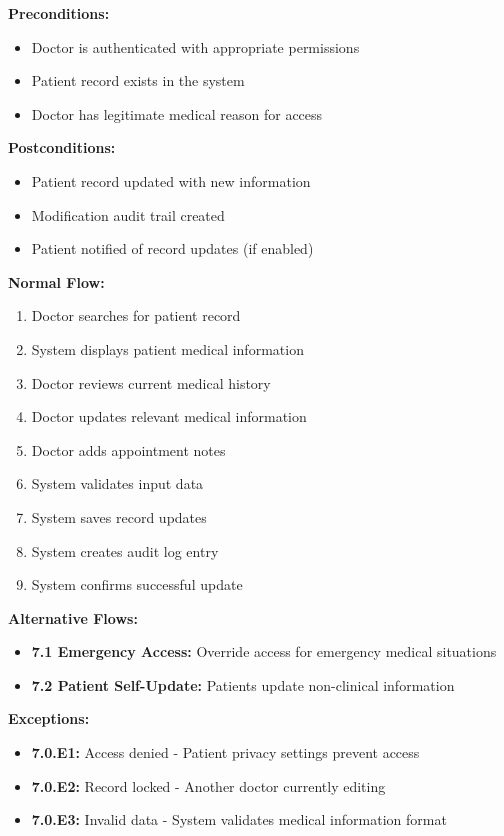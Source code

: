 \documentclass[12pt,a4paper]{article}
\begin{document}
\textbf{Preconditions:}
\begin{itemize}
    \item Doctor is authenticated with appropriate permissions
    \item Patient record exists in the system
    \item Doctor has legitimate medical reason for access
\end{itemize}

\textbf{Postconditions:}
\begin{itemize}
    \item Patient record updated with new information
    \item Modification audit trail created
    \item Patient notified of record updates (if enabled)
\end{itemize}

\textbf{Normal Flow:}
\begin{enumerate}
    \item Doctor searches for patient record
    \item System displays patient medical information
    \item Doctor reviews current medical history
    \item Doctor updates relevant medical information
    \item Doctor adds appointment notes
    \item System validates input data
    \item System saves record updates
    \item System creates audit log entry
    \item System confirms successful update
\end{enumerate}

\textbf{Alternative Flows:}
\begin{itemize}
    \item \textbf{7.1 Emergency Access:} Override access for emergency medical situations
    \item \textbf{7.2 Patient Self-Update:} Patients update non-clinical information
\end{itemize}

\textbf{Exceptions:}
\begin{itemize}
    \item \textbf{7.0.E1:} Access denied - Patient privacy settings prevent access
    \item \textbf{7.0.E2:} Record locked - Another doctor currently editing
    \item \textbf{7.0.E3:} Invalid data - System validates medical information format
\end{itemize}
\end{document}

